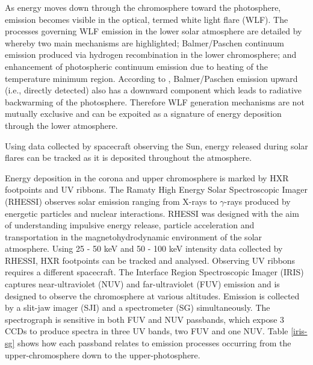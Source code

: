 As energy moves down through the chromosphere toward the photosphere, emission becomes visible in the optical, termed white light flare (WLF). The processes governing WLF emission in the lower solar atmosphere are detailed by \cite{2007ASPC..368..417D} whereby two main mechanisms are highlighted; Balmer/Paschen continuum emission produced via hydrogen recombination in the lower chromosphere; and enhancement of photospheric continuum emission due to heating of the temperature minimum region. According to \cite{1989SoPh..124..303M}, Balmer/Paschen emission upward (i.e., directly detected) also has a downward component which leads to radiative backwarming of the photosphere. Therefore WLF generation mechanisms are not mutually exclusive and can be expoited as a signature of energy deposition through the lower atmosphere. 


Using data collected by spacecraft observing the Sun, energy released during solar flares can be tracked as it is deposited throughout the atmosphere. 

Energy deposition in the corona and upper chromosphere is marked by HXR footpoints and UV ribbons. The Ramaty High Energy Solar Spectroscopic Imager (RHESSI) observes solar emission ranging from X-rays to $\gamma$-rays produced by energetic particles and nuclear interactions. RHESSI was designed with the aim of understanding impulsive energy release, particle acceleration and transportation in the magnetohydrodynamic environment of the solar atmosphere. Using 25 - 50 keV and 50 - 100 keV intensity data collected by RHESSI, HXR footpoints can be tracked and analysed. Observing UV ribbons requires a different spacecraft. The Interface Region Spectroscopic Imager (IRIS) captures near-ultraviolet (NUV) and far-ultraviolet (FUV) emission and is designed to observe the chromosphere at various altitudes. Emission is collected by a slit-jaw imager (SJI) and a spectrometer (SG) simultaneously. The spectrograph is sensitive in both FUV and NUV passbands, which expose 3 CCDs to produce spectra in three UV bands, two FUV and one NUV. Table \ref{iris-sg} shows how each passband relates to emission processes occurring from the upper-chromosphere down to the upper-photosphere. 



